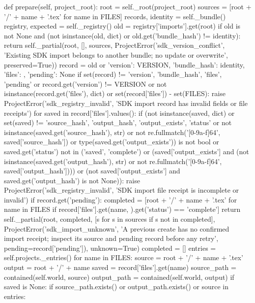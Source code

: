     def prepare(self, project_root):
        root = self._root(project_root)
        sources = [root + '/' + name + '.tex' for name in FILES]
        records, identity = self._bundle()
        registry, expected = self._registry()
        old = registry['imports'].get(root)
        if old is not None and (not isinstance(old, dict) or old.get('bundle_hash') != identity):
            return self._partial(root, [], sources, ProjectError('sdk_version_conflict', 'Existing SDK import belongs to another bundle; no update or overwrite', preserved=True))
        record = old or {'version': VERSION, 'bundle_hash': identity, 'files': {}, 'pending': None}
        if set(record) != {'version', 'bundle_hash', 'files', 'pending'} or record.get('version') != VERSION or not isinstance(record.get('files'), dict) or set(record['files']) - set(FILES):
            raise ProjectError('sdk_registry_invalid', 'SDK import record has invalid fields or file receipts')
        for saved in record['files'].values():
            if (not isinstance(saved, dict) or set(saved) != {'source_hash', 'output_hash', 'output_exists', 'status'}
                    or not isinstance(saved.get('source_hash'), str) or not re.fullmatch('[0-9a-f]{64}', saved['source_hash'])
                    or type(saved.get('output_exists')) is not bool or saved.get('status') not in ('saved', 'complete')
                    or (saved['output_exists'] and (not isinstance(saved.get('output_hash'), str) or not re.fullmatch('[0-9a-f]{64}', saved['output_hash'])))
                    or (not saved['output_exists'] and saved.get('output_hash') is not None)):
                raise ProjectError('sdk_registry_invalid', 'SDK import file receipt is incomplete or invalid')
        if record.get('pending'):
            completed = [root + '/' + name + '.tex' for name in FILES if record['files'].get(name, {}).get('status') == 'complete']
            return self._partial(root, completed, [s for s in sources if s not in completed],
                                 ProjectError('sdk_import_unknown', 'A previous create has no confirmed import receipt; inspect its source and pending record before any retry', pending=record['pending']), unknown=True)
        completed = []
        entries = self.projects._entries()
        for name in FILES:
            source = root + '/' + name + '.tex'
            output = root + '/' + name
            saved = record['files'].get(name)
            source_path = contained(self.world, source)
            output_path = contained(self.world, output)
            if saved is None:
                if source_path.exists() or output_path.exists() or source in entries:
